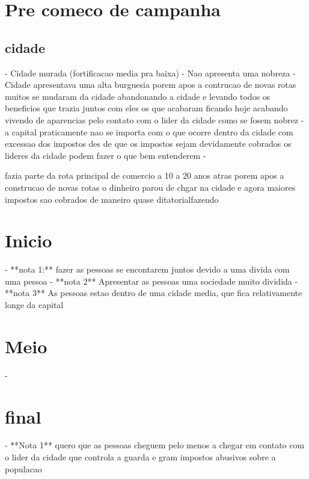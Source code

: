 \documentclass{book}
\begin{document}
 \chapter{Pre comeco de campanha}
 \section{cidade}
- Cidade murada (fortificacao media pra baixa)
- Nao apresenta uma nobreza 
- Cidade apresentava uma alta burguesia porem apos a contrucao de novas rotas muitos se mudaram da cidade abandonando a cidade e levando todos os beneficios que trazia juntos com eles os que acabaram ficando hoje acabando vivendo de aparencias pelo contato com o lider da cidade como se fosem nobrez 
- a capital praticamente nao se importa com o que ocorre dentro da cidade com excessao dos impostos des de que os impostos sejam devidamente cobrados os lideres da cidade podem fazer o que bem entenderem 
- 

fazia parte da rota principal de comercio a 10 a 20  anos atras porem apos  a construcao de novas rotas o dinheiro parou de chgar na cidade e agora maiores impostos sao cobrados de maneiro quase ditatorialfazendo

\chapter{Inicio}

- **nota 1:** fazer as pessoas se encontarem juntos devido a uma divida com uma pessoa 
- **nota 2** Apresentar as pessoas uma sociedade muito dividida 
- **nota 3** As pessoas estao dentro de uma cidade media, que fica relativamente longe da capital

\chapter{Meio}

- 

\chapter{final}

- **Nota 1** quero que as pessoas cheguem pelo menos a chegar em contato com o lider da cidade que controla a guarda e gram impostos abusivos sobre a populacao    
\end{document}
